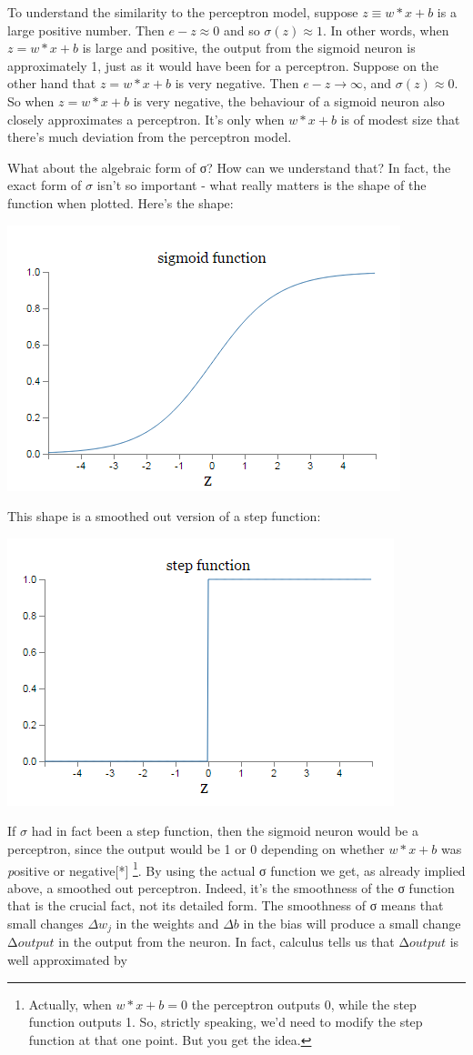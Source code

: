 \documentclass[a4paper,12pt]{report}%
\begin{document}
To understand the similarity to the perceptron model, suppose $ z \equiv w*x + b $ is a large positive number. Then $ e−z ≈ 0 $ and so $ σ(z) ≈ 1 $. In other words, when $ z = w*x + b $ is large and positive, the output from the sigmoid neuron is approximately 1, just as it would have been for a perceptron. Suppose on the other hand that $z = w*x + b$ is very negative. Then $ e - z → ∞ $, and $ \sigma(z) \approx 0 $. So when $z = w*x + b$ is very negative, the behaviour of a sigmoid neuron also closely approximates a perceptron. It's only when $ w*x + b $ is of modest size that there's much deviation from the perceptron model.

What about the algebraic form of σ? How can we understand that? In fact, the exact form of $\sigma$ isn't so important - what really matters is the shape of the function when plotted. Here's the shape:

\begin{center}
 \includegraphics[width=0.5\linewidth]{images/sigmoid.png}
\end{center}

This shape is a smoothed out version of a step function:

\begin{center}
 \includegraphics[width=0.5\linewidth]{images/step.png}
\end{center}
If $\sigma$ had in fact been a step function, then the sigmoid neuron would be a perceptron, since the output would be 1 or 0 depending on whether $ w*x + b $ was {\emph positive or negative}[*] \footnote{\color{blue}Actually, when $w*x + b = 0 $ the perceptron outputs 0, while the step function outputs 1. So, strictly speaking, we'd need to modify the step function at that one point. But you get the idea.}. By using the actual σ function we get, as already implied above, a smoothed out perceptron. Indeed, it's the smoothness of the σ function that is the crucial fact, not its detailed form. The smoothness of σ means that small changes $Δw_{j}$ in the weights and $Δb$ in the bias will produce a small change Δ$output$ in the output from the neuron. In fact, calculus tells us that Δ$output$ is well approximated by
\end{document}

